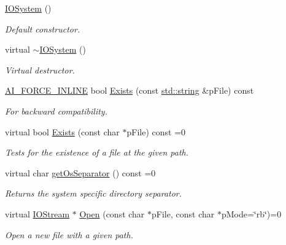 \begin{DoxyCompactItemize}
\item 
\hyperlink{class_assimp_1_1_i_o_system_af8ba1ee2dc0686da8fc9e3dad49af801}{I\-O\-System} ()
\begin{DoxyCompactList}\small\item\em Default constructor. \end{DoxyCompactList}\item 
virtual \hyperlink{class_assimp_1_1_i_o_system_a617417f1c5125770606fea3b41068b36}{$\sim$\-I\-O\-System} ()
\begin{DoxyCompactList}\small\item\em Virtual destructor. \end{DoxyCompactList}\item 
\hyperlink{defs_8h_a61d239a320b58eca56bacc46fc2c79b8}{A\-I\-\_\-\-F\-O\-R\-C\-E\-\_\-\-I\-N\-L\-I\-N\-E} bool \hyperlink{class_assimp_1_1_i_o_system_a7ae6cfaea4957408967463bfc3b84b27}{Exists} (const \hyperlink{_s_d_l__opengl_8h_a4643b88e2349494c65861169f8944eca}{std\-::string} \&p\-File) const 
\begin{DoxyCompactList}\small\item\em For backward compatibility. \end{DoxyCompactList}\item 
virtual bool \hyperlink{class_assimp_1_1_i_o_system_a79f5fe8d2dbe1056c9418f7de9a72445}{Exists} (const char $\ast$p\-File) const =0
\begin{DoxyCompactList}\small\item\em Tests for the existence of a file at the given path. \end{DoxyCompactList}\item 
virtual char \hyperlink{class_assimp_1_1_i_o_system_a40e412875b985bdb638f00ef0f20fff6}{get\-Os\-Separator} () const =0
\begin{DoxyCompactList}\small\item\em Returns the system specific directory separator. \end{DoxyCompactList}\item 
virtual \hyperlink{class_assimp_1_1_i_o_stream}{I\-O\-Stream} $\ast$ \hyperlink{class_assimp_1_1_i_o_system_ac512ece3b0701de5682553007a4c0816}{Open} (const char $\ast$p\-File, const char $\ast$p\-Mode=\char`\"{}rb\char`\"{})=0
\begin{DoxyCompactList}\small\item\em Open a new file with a given path. \end{DoxyCompactList}\item 

\end{DoxyCompactItemize}
